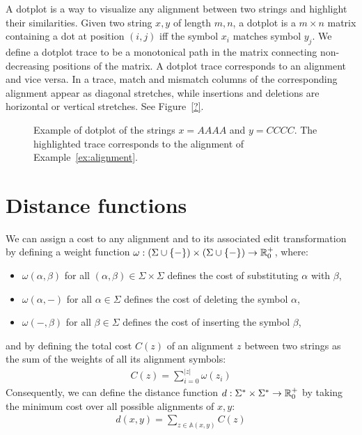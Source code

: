 A dotplot is a way to visualize any alignment between two strings and highlight their similarities.
Given two string $x,y$ of length $m,n$, a dotplot is a $m \times n$ matrix containing a dot at position $(i,j)$ iff the symbol $x_i$ matches symbol $y_j$.
We define a dotplot trace to be a monotonical path in the matrix connecting non-decreasing positions of the matrix.
A dotplot trace corresponds to an alignment and vice versa.
In a trace, match and mismatch columns of the corresponding alignment appear as diagonal stretches, while insertions and deletions are horizontal or vertical stretches.
See Figure~\ref{?}.

\begin{figure}[h]
\begin{center}
\caption[Example of dotplot]{Example of dotplot of the strings $x=AAAA$ and $y=CCCC$. The highlighted trace corresponds to the alignment of Example~\ref{ex:alignment}.}
\label{fig:dotplot}

\end{center}
\end{figure}

\section{Distance functions}

We can assign a cost to any alignment and to its associated edit transformation by defining a weight function $\omega : (\Sigma \cup \{ - \}) \times (\Sigma \cup \{ - \}) \rightarrow \mathbb {R}_0^{+}$, where:
\begin{itemize}
\item $\omega(\alpha,\beta)$ for all $(\alpha,\beta) \in \Sigma \times \Sigma$ defines the cost of substituting $\alpha$ with $\beta$,
\item $\omega(\alpha,-)$ for all $\alpha \in \Sigma$ defines the cost of deleting the symbol $\alpha$,
\item $\omega(-,\beta)$ for all $\beta \in \Sigma$ defines the cost of inserting the symbol $\beta$,
\end{itemize}
and by defining the total cost $C(z)$ of an alignment $z$ between two strings as the sum of the weights of all its alignment symbols:
\begin{eqnarray}
C(z) = \sum_{i=0}^{|z|}{\omega(z_i)}
\end{eqnarray}
Consequently, we can define the distance function $d : \Sigma^{*} \times \Sigma^{*} \rightarrow \mathbb {R}_0^{+}$ by taking the minimum cost over all possible alignments of $x,y$:
\begin{eqnarray}
d(x,y) = \sum_{z \in \mathbb{A}(x,y)}{C(z)}
\end{eqnarray}

